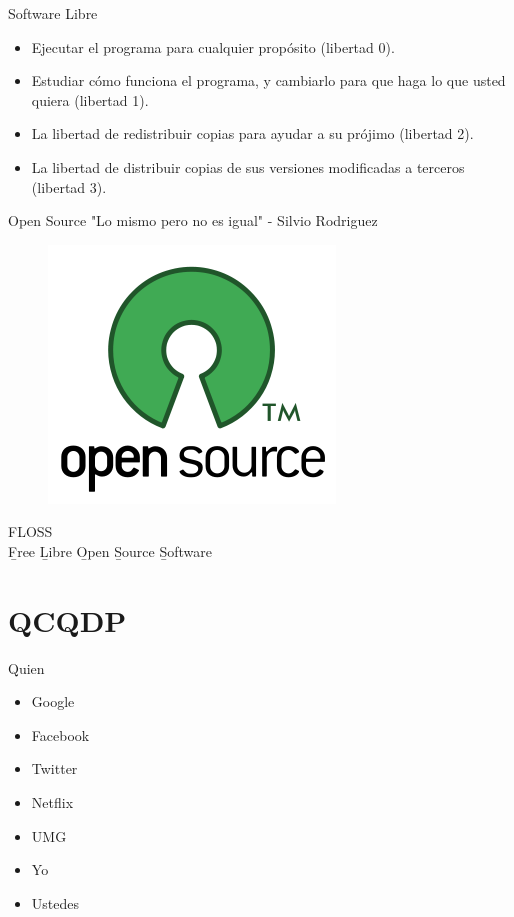 \documentclass{beamer}
\begin{document}
\begin{frame}{Software Libre}
    \begin{itemize}
        \item Ejecutar el programa para cualquier propósito (libertad 0).
        \item Estudiar cómo funciona el programa, y cambiarlo para que haga lo que usted quiera (libertad 1).
        \item La libertad de redistribuir copias para ayudar a su prójimo (libertad 2).
        \item La libertad de distribuir copias de sus versiones modificadas a terceros (libertad 3).
    \end{itemize}
\end{frame}


\begin{frame}{Open Source}
    "Lo mismo pero no es igual" - Silvio Rodriguez
    \begin{figure}[tbph]
        \centering
        \includegraphics[width=0.5\linewidth]{Images/os.png}
    \end{figure}
\end{frame}

\begin{frame}{}
FLOSS\\
\b{F}ree \b{L}ibre \b{O}pen \b{S}ource \b{S}oftware
\end{frame}



\section{QCQDP}
\begin{frame}{Quien}
    \begin{itemize}
    \item Google
    \item Facebook
    \item Twitter
    \item Netflix
    \item UMG
    \item Yo
    \item Ustedes
    \end{itemize}
\end{frame}
\end{document}
